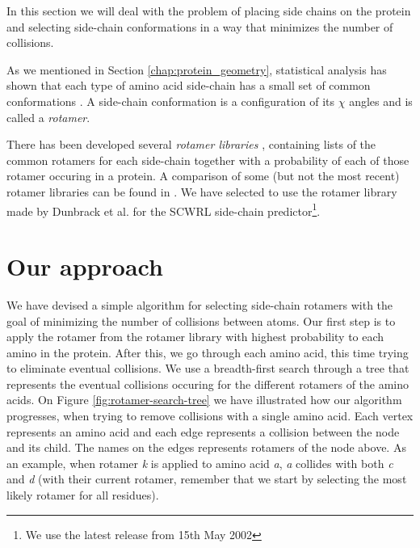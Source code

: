 In this section we will deal with the problem of placing side chains
on the protein and selecting side-chain conformations in a way that
minimizes the number of collisions.

As we mentioned in Section \ref{chap:protein_geometry}, statistical
analysis has shown that each type of amino acid side-chain has a small
set of common conformations \cite{dunbrack2002rotamer}. A side-chain
conformation is a configuration of its $\chi$ angles and is called a
\textit{rotamer}.

There has been developed several \textit{rotamer libraries}
\cite{dunbrack1997bayesian, lovell2000penultimate}, containing lists
of the common rotamers for each side-chain together with a probability
of each of those rotamer occuring in a protein. A comparison of some
(but not the most recent) rotamer libraries can be found in
\cite{dunbrack2002rotamer}. We have selected to use the rotamer
library made by Dunbrack et al. for the SCWRL side-chain
predictor\footnote{We use the latest release from 15th May 2002}.

\section{Our approach}
We have devised a simple algorithm for selecting side-chain rotamers
with the goal of minimizing the number of collisions between
atoms. Our first step is to apply the rotamer from the rotamer library
with highest probability to each amino in the protein. After this, we
go through each amino acid, this time trying to eliminate eventual
collisions. We use a breadth-first search through a tree that
represents the eventual collisions occuring for the different rotamers
of the amino acids. On Figure \ref{fig:rotamer-search-tree} we have
illustrated how our algorithm progresses, when trying to remove
collisions with a single amino acid. Each vertex represents an amino
acid and each edge represents a collision between the node and its
child. The names on the edges represents rotamers of the node
above. As an example, when rotamer \textit{k} is applied to amino acid
\textit{a}, \textit{a} collides with both \textit{c} and \textit{d}
(with their current rotamer, remember that we start by selecting the
most likely rotamer for all residues).


